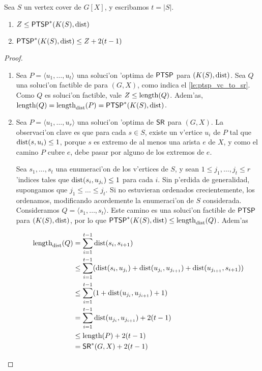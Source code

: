 \begin{theorem}
\label{th:vertex_cover_bounds}
Sea $S$ un vertex cover de $G[X]$, y escribamos $t = |S|$.

\begin{enumerate}
\item $Z \leq \textnormal{\textsf{PTSP}}^*(K(S), \textnormal{dist})$
\item $\textnormal{\textsf{PTSP}}^*(K(S), \textnormal{dist}) \leq Z + 2(t - 1)$
\end{enumerate}

\begin{proof}
\hfill
\begin{enumerate}
\item Sea $P = \langle u_1, \dots, u_t \rangle$ una soluci'on 'optima de $\textnormal{\textsf{PTSP}}$ para $(K(S), \textnormal{dist})$. Sea $Q$ una soluci'on factible de  para $(G, X)$, como indica el \autoref{le:ptsp_vc_to_sr}. Como $Q$ es soluci'on factible, vale $Z \leq \textnormal{length}(Q)$. Adem'as, $\textnormal{length}(Q) = \textnormal{length}_{\textnormal{dist}}(P) = \textnormal{\textsf{PTSP}}^*(K(S), \textnormal{dist})$.

\item Sea $P = \langle u_1, \dots, u_r \rangle$ una soluci'on 'optima de $\textnormal{\textsf{SR}}$ para $(G, X)$. La observaci'on clave es que para cada $s \in S$, existe un v'ertice $u_{i}$ de $P$ tal que $\textnormal{dist}(s, u_i) \leq 1$, porque $s$ es extremo de al menos una arista $e$ de $X$, y como el camino $P$ cubre $e$, debe pasar por alguno de los extremos de $e$.

Sea $s_1, \dots, s_t$ una enumeraci'on de los v'ertices de $S$, y sean $1 \leq j_1, \dots, j_t \leq r$ 'indices tales que $\textnormal{dist}(s_i, u_{j_i}) \leq 1$ para cada $i$. Sin p'erdida de generalidad, supongamos que $j_1 \leq \dots \leq j_t$. Si no estuvieran ordenados crecientemente, los ordenamos, modificando acordemente la enumeraci'on de $S$ considerada. Consideramos $Q = \langle s_1, \dots, s_t \rangle$. Este camino es una soluci'on factible de $\textnormal{\textsf{PTSP}}$ para $(K(S), \textnormal{dist})$, por lo que $\textnormal{\textsf{PTSP}}^*(K(S), \textnormal{dist}) \leq \textnormal{length}_{\textnormal{dist}}(Q)$. Adem'as

\begin{align*}
\textnormal{length}_{\textnormal{dist}}(Q) &= \sum_{i = 1}^{t - 1}\textnormal{dist}(s_i, s_{i + 1})\\
&\leq \sum_{i = 1}^{t - 1}(\textnormal{dist}(s_i, u_{j_i}) + \textnormal{dist}(u_{j_i}, u_{j_{i + 1}}) + \textnormal{dist}(u_{j_{i + 1}}, s_{i + 1}))\\
&\leq \sum_{i = 1}^{t - 1}(1 + \textnormal{dist}(u_{j_i}, u_{j_{i + 1}}) + 1)\\
&= \sum_{i = 1}^{t - 1} \textnormal{dist}(u_{j_i}, u_{j_{i + 1}}) + 2(t - 1)\\
&\leq \textnormal{length}(P) + 2(t - 1)\\
&= \textnormal{\textsf{SR}}^*(G, X) + 2(t - 1)
\end{align*}
\end{enumerate}
\end{proof}
\end{theorem}


